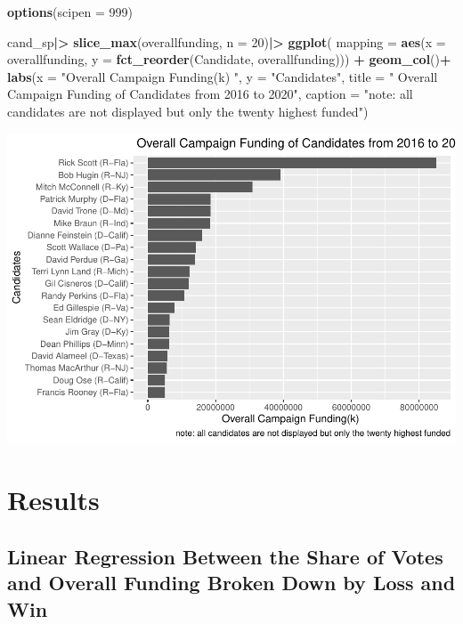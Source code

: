 \documentclass[
]{article}
\newenvironment{Shaded}{\begin{snugshade}}{\end{snugshade}}
\newcommand{\AttributeTok}[1]{\textcolor[rgb]{0.13,0.29,0.53}{#1}}
\newcommand{\DecValTok}[1]{\textcolor[rgb]{0.00,0.00,0.81}{#1}}
\newcommand{\FunctionTok}[1]{\textcolor[rgb]{0.13,0.29,0.53}{\textbf{#1}}}
\newcommand{\NormalTok}[1]{#1}
\newcommand{\SpecialCharTok}[1]{\textcolor[rgb]{0.81,0.36,0.00}{\textbf{#1}}}
\newcommand{\StringTok}[1]{\textcolor[rgb]{0.31,0.60,0.02}{#1}}
\begin{document}
\begin{Shaded}
\begin{Highlighting}[]
\FunctionTok{options}\NormalTok{(}\AttributeTok{scipen =} \DecValTok{999}\NormalTok{)}


\NormalTok{cand\_sp}\SpecialCharTok{|\textgreater{}}
  \FunctionTok{slice\_max}\NormalTok{(overallfunding, }\AttributeTok{n =} \DecValTok{20}\NormalTok{)}\SpecialCharTok{|\textgreater{}}
\FunctionTok{ggplot}\NormalTok{(}
       \AttributeTok{mapping =} \FunctionTok{aes}\NormalTok{(}\AttributeTok{x =}\NormalTok{ overallfunding, }\AttributeTok{y =} \FunctionTok{fct\_reorder}\NormalTok{(Candidate, overallfunding))) }\SpecialCharTok{+}
  \FunctionTok{geom\_col}\NormalTok{()}\SpecialCharTok{+}
  \FunctionTok{labs}\NormalTok{(}\AttributeTok{x =} \StringTok{"Overall Campaign Funding(k) "}\NormalTok{,}
       \AttributeTok{y =} \StringTok{"Candidates"}\NormalTok{,}
       \AttributeTok{title =} \StringTok{" Overall Campaign Funding of Candidates from 2016 to 2020"}\NormalTok{,}
       \AttributeTok{caption =} \StringTok{"note: all candidates are not displayed but only the twenty highest funded"}\NormalTok{)}
\end{Highlighting}
\end{Shaded}

\includegraphics{index_files/figure-latex/unnamed-chunk-2-1.pdf}

\hypertarget{results}{%
\section{Results}\label{results}}

\hypertarget{linear-regression-between-the-share-of-votes-and-overall-funding-broken-down-by-loss-and-win}{%
\subsection{\texorpdfstring{\textbf{Linear Regression Between the Share
of Votes and Overall Funding Broken Down by Loss and
Win}}{Linear Regression Between the Share of Votes and Overall Funding Broken Down by Loss and Win}}\label{linear-regression-between-the-share-of-votes-and-overall-funding-broken-down-by-loss-and-win}}
\end{document}
